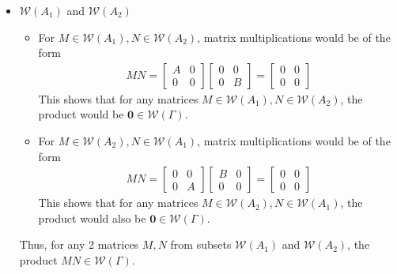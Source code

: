 \documentclass{article}
\begin{document}
\begin{itemize}
    \item $\mathcal{W}(A_1)$ and $\mathcal{W}(A_2)$ \\
    \begin{itemize}
        \item For $M\in\mathcal{W}(A_1),N \in \mathcal{W}(A_2)$, matrix multiplications would be of the form \\
        \begin{align*}
            MN = \begin{bmatrix}
                A & 0 \\ 0 & 0
            \end{bmatrix}\begin{bmatrix}
                0&0\\0&B
            \end{bmatrix} = \begin{bmatrix}
                0&0\\0&0
            \end{bmatrix}
        \end{align*}
        This shows that for any matrices $M\in\mathcal{W}(A_1),N \in \mathcal{W}(A_2)$, the product would be $\mathbf{0}\in\mathcal{W}(\Gamma)$.

        \item For $M\in\mathcal{W}(A_2),N \in \mathcal{W}(A_1)$, matrix multiplications would be of the form \\
        \begin{align*}
            MN = \begin{bmatrix}
                0 & 0 \\ 0 & A
            \end{bmatrix}\begin{bmatrix}
                B&0\\0&0
            \end{bmatrix} = \begin{bmatrix}
                0&0\\0&0
            \end{bmatrix}
        \end{align*}
        This shows that for any matrices $M\in\mathcal{W}(A_2),N \in \mathcal{W}(A_1)$, the product would also be $\mathbf{0}\in\mathcal{W}(\Gamma)$.
    \end{itemize}
    Thus, for any 2 matrices $M,N$ from subsets $\mathcal{W}(A_1)$ and $\mathcal{W}(A_2)$, the product $MN \in \mathcal{W}(\Gamma)$.


\end{itemize}
\end{document}
